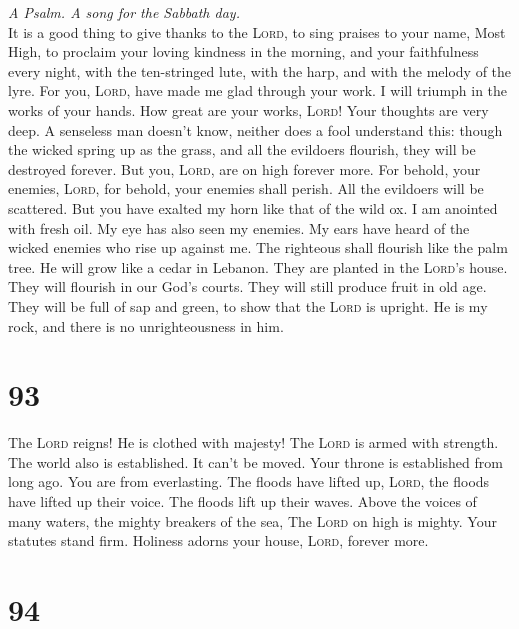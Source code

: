 \emph{A Psalm. A song for the Sabbath day.}\\
 It is a good thing to give thanks to the \textsc{Lord},
to sing praises to your name, Most High,  to proclaim your
loving kindness in the morning, and your faithfulness every night,
 with the ten-stringed lute, with the harp, and with the
melody of the lyre.  For you, \textsc{Lord}, have made me
glad through your work. I will triumph in the works of your hands.
 How great are your works, \textsc{Lord}! Your thoughts
are very deep.  A senseless man doesn't know, neither does
a fool understand this:  though the wicked spring up as
the grass, and all the evildoers flourish, they will be destroyed
forever.  But you, \textsc{Lord}, are on high forever
more.  For behold, your enemies, \textsc{Lord}, for
behold, your enemies shall perish. All the evildoers will be scattered.
 But you have exalted my horn like that of the wild ox. I
am anointed with fresh oil.  My eye has also seen my
enemies. My ears have heard of the wicked enemies who rise up against
me.  The righteous shall flourish like the palm tree. He
will grow like a cedar in Lebanon.  They are planted in
the \textsc{Lord}'s house. They will flourish in our God's courts.
 They will still produce fruit in old age. They will be
full of sap and green,  to show that the \textsc{Lord} is
upright. He is my rock, and there is no unrighteousness in him.

\hypertarget{section-92}{%
\section{93}\label{section-92}}

 The \textsc{Lord} reigns! He is clothed with majesty! The
\textsc{Lord} is armed with strength. The world also is established. It
can't be moved.  Your throne is established from long ago.
You are from everlasting.  The floods have lifted up,
\textsc{Lord}, the floods have lifted up their voice. The floods lift up
their waves.  Above the voices of many waters, the mighty
breakers of the sea, The \textsc{Lord} on high is mighty. 
Your statutes stand firm. Holiness adorns your house, \textsc{Lord},
forever more.

\hypertarget{section-93}{%
\section{94}\label{section-93}}

